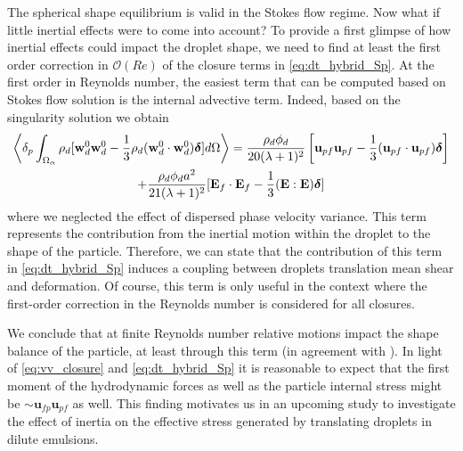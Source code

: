 The spherical shape equilibrium is valid in the Stokes flow regime. 
Now what if little inertial effects were to come into account?
To provide a first glimpse of how inertial effects could impact the droplet shape, we need to find at least the first order correction in $\mathcal{O}(Re)$ of the closure terms in \ref{eq:dt_hybrid_Sp}. 
At the first order in Reynolds number, the easiest term that can be computed based on Stokes flow solution is the internal advective term. 
Indeed, based on the singularity solution we obtain
\begin{multline}
    \pOavg{\rho_d [\textbf{w}_d^0  \textbf{w}_d^0  - \frac{1}{3}\rho_d (\textbf{w}_d^0 \cdot \textbf{w}_d^0)\bm\delta]}
    = 
    \frac{\rho_d \phi_d}{20(\lambda +1 )^2}
    \left[
        \textbf{u}_{p f}\textbf{u}_{p f} 
    -\frac{1}{3} (\textbf{u}_{p f}\cdot \textbf{u}_{p f})\bm\delta
    \right]\\
    + \frac{\rho_d \phi_d a^2}{21 (\lambda + 1)^2}[\textbf{E}_f\cdot \textbf{E}_f - \frac{1}{3}(\textbf{E}:\textbf{E})\bm\delta]
    \label{eq:vv_closure}
\end{multline}
where we neglected the effect of dispersed phase velocity variance. 
This term represents the contribution from the inertial motion within the droplet to the shape of the particle. 
Therefore, we can state that the contribution of this term in \ref{eq:dt_hybrid_Sp} induces a coupling between droplets translation mean shear and deformation. 
Of course, this term is only useful in the context where the first-order correction in the Reynolds number is considered for all closures. 

We conclude that at finite Reynolds number relative motions impact the shape balance of the particle, at least through this term (in agreement with \citet{taylor1964deformation}). 
In light of \ref{eq:vv_closure} and \ref{eq:dt_hybrid_Sp} it is reasonable to expect that the first moment of the hydrodynamic forces as well as the particle internal stress might be $\sim \textbf{u}_{fp}\textbf{u}_{pf} $ as well. 
This finding motivates us in an upcoming study to investigate the effect of inertia on the effective stress generated by translating droplets in dilute emulsions.
